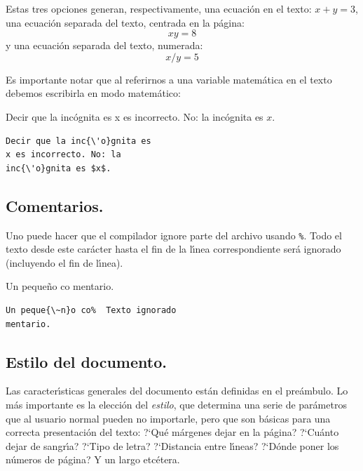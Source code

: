 Estas tres opciones generan, respectivamente, una ecuaci{\'o}n en el
texto: $x+y=3$, una ecuaci{\'o}n separada del texto, centrada en la
p{\'a}gina: 
$$xy=8$$
y una ecuaci{\'o}n separada del texto, numerada:
\begin{equation}
x/y=5
\end{equation}

Es importante notar que al referirnos a una variable matem{\'a}tica en
el texto debemos escribirla en modo matem{\'a}tico:

\vspace{.3cm}
{\small
\begin{minipage}[t]{5cm}
Decir que la inc{\'o}gnita es x es incorrecto. 
No: la inc{\'o}gnita es $x$. 
\end{minipage}
\hspace{2cm}
\begin{minipage}[t]{5cm}
\begin{verbatim}
Decir que la inc{\'o}gnita es 
x es incorrecto. No: la 
inc{\'o}gnita es $x$. 
\end{verbatim}
\end{minipage}
}

\subsection{Comentarios.}

Uno puede hacer que el compilador ignore parte del archivo usando
\verb+%+. Todo el texto desde este car{\'a}cter hasta el fin de la
l\'{\i}nea correspondiente ser{\'a} ignorado (incluyendo el fin de
l\'{\i}nea). 

\vspace{.3cm}
{\small
\begin{minipage}[t]{5cm}
Un peque{\~n}o co%
mentario.
\end{minipage}
\hspace{.8cm}
\begin{minipage}[t]{8cm}
\begin{verbatim}
Un peque{\~n}o co%  Texto ignorado
mentario.
\end{verbatim}
\end{minipage}
}
\vspace{.3cm}

\subsection{Estilo del documento.}

Las caracter\'{\i}sticas generales del documento est{\'a}n definidas en
el pre{\'a}mbulo. Lo m{\'a}s importante es la elecci{\'o}n del {\em
estilo}, que determina una serie de par{\'a}metros que al usuario
normal pueden no importarle, pero que son b{\'a}sicas para una correcta
presentaci{\'o}n del texto: ?`Qu{\'e} m{\'a}rgenes dejar en la p{\'a}gina?
?`Cu{\'a}nto dejar de sangr\'{\i}a? ?`Tipo de letra? ?`Distancia entre
l\'{\i}neas? ?`D{\'o}nde poner los n{\'u}meros de p{\'a}gina? Y un largo
etc{\'e}tera. 

